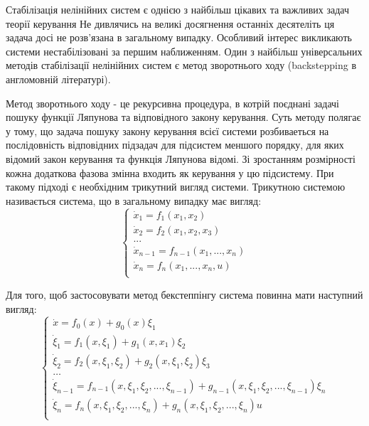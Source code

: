 \documentclass{article}
\begin{document}
Стабілізація нелінійних систем є однією з найбільш цікавих та важливих задач теорії керування
Не дивлячись на великі досягнення останніх десятеліть ця задача досі не розв'язана в 
загальному випадку. Особливий інтерес викликають системи нестабілізовані за першим
наближенням. Один з найбільш універсальних методів стабілізації нелінійних систем є метод зворотнього ходу 
(backstepping в англомовній літературі). 

Метод зворотнього ходу - це рекурсивна процедура, в котрій поєднані задачі пошуку функції Ляпунова та відповідного закону
керування. Суть методу полягає у тому, що задача пошуку закону керування всієї системи розбиваеться на послідовність
відповідних підзадач для підсистем меншого порядку, для яких відомий закон керування та функція Ляпунова відомі.
Зі зростанням розмірності кожна додаткова фазова змінна входить як керування у цю підсистему. 
При такому підході є необхідним трикутний вигляд системи.
Трикутною системою називається система,
що в загальному випадку має вигляд: 
\begin{equation}
	\begin{cases}
        \dot x_1 = f_1(x_1, x_2)\\
        \dot x_2 = f_2(x_1, x_2 ,x_3)\\
        ...\\
        \dot x_{n-1} = f_{n-1}(x_1, ... ,x_n)\\
        \dot x_{n} = f_{n}(x_1, ... ,x_n,u)\\
	\end{cases}
\end{equation}
\pagebreak




Для того, щоб застосовувати метод бекстеппінгу система повинна мати наступний вигляд:
\begin{equation}
    \begin{cases}
        \dot x           = f_0(x)+g_0(x)\xi_1\\
        \dot \xi_1       = f_1(x, \xi_1)+g_{1}(x, x_1)\xi_2 \\
        \dot \xi_2       = f_2(x, \xi_1, \xi_2) + g_2(x, \xi_1, \xi_2)\xi_3 \\
        \dots\\
        \dot \xi_{n-1}   = f_{n-1}(x, \xi_1, \xi_2, ... ,\xi_{n-1}) 
        +g_{n-1}(x, \xi_1, \xi_2, ... ,\xi_{n-1}) \xi_n\\
        \dot \xi_{n}     = f_{n}(x, \xi_1, \xi_2, ... ,\xi_{n}) 
        +g_{n}(x, \xi_1, \xi_2, ... ,\xi_{n})u\\

	\end{cases}
\end{equation}
\end{document}
